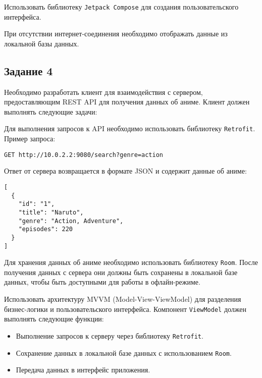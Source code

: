 \documentclass[a4paper,12pt]{article}
\begin{document}
Использовать библиотеку \texttt{Jetpack Compose} для создания пользовательского интерфейса.

При отсутствии интернет-соединения необходимо отображать данные из локальной базы данных.

\subsection*{Задание 4}

Необходимо разработать клиент для взаимодействия с сервером, предоставляющим REST API для получения данных об аниме. Клиент должен выполнять следующие задачи:


Для выполнения запросов к API необходимо использовать библиотеку \texttt{Retrofit}. Пример запроса:

\begin{verbatim}
GET http://10.0.2.2:9080/search?genre=action
\end{verbatim}

Ответ от сервера возвращается в формате JSON и содержит данные об аниме:

\begin{verbatim}
[
  {
    "id": "1",
    "title": "Naruto",
    "genre": "Action, Adventure",
    "episodes": 220
  }
]
\end{verbatim}

Для хранения данных об аниме необходимо использовать библиотеку \texttt{Room}. После получения данных с сервера они должны быть сохранены в локальной базе данных, чтобы быть доступными для работы в офлайн-режиме.

Использовать архитектуру MVVM (Model-View-ViewModel) для разделения бизнес-логики и пользовательского интерфейса. Компонент \texttt{ViewModel} должен выполнять следующие функции:
\begin{itemize}
    \item Выполнение запросов к серверу через библиотеку \texttt{Retrofit}.
    \item Сохранение данных в локальной базе данных с использованием \texttt{Room}.
    \item Передача данных в интерфейс приложения.
\end{itemize}
\end{document}
